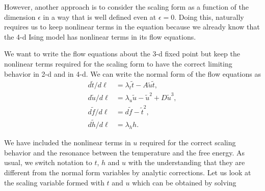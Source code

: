 \documentclass[
 reprint,
 amsmath,amssymb,
 aps, superscriptaddress, pre
]{revtex4-1}
\begin{document}
However, another approach is to consider the scaling form as a function of the dimension $\epsilon$ in a way that is well defined even at $\epsilon = 0$. Doing this, naturally requires us to keep nonlinear terms in the equation because we already know that the 4-d Ising model has nonlinear terms in its flow equations.

We want to write the flow equations about the 3-d fixed point but keep the nonlinear terms required for the scaling form to have the correct limiting behavior in 2-d and in 4-d. We can write the normal form of the flow equations as 
 \begin{align}
 {d \tilde t}/{d \ell} &= \lambda_t \tilde{t} - A \tilde{u} \tilde{t} ,  \\ 
 {d \tilde u}/{d \ell} &= \lambda_u \tilde{u}- \tilde{u}^2 + D \tilde{u}^3,  \\
 {d \tilde f}/{d \ell} &= d \tilde f - {\tilde t}^2  , \\
 {d \tilde h}/{d \ell} &= \lambda_h h .
\end{align}

We have included the nonlinear terms in $u$ required for the correct scaling behavior and the resonance between the temperature and the free energy. As usual, we switch notation to $t$, $h$ and $u$ with the understanding that they are different from the normal form variables by analytic corrections. Let us look at the scaling variable formed with $t$ and $u$ which can be obtained by solving
\end{document}
